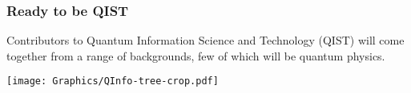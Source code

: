 
\begin{frame}
  \frametitle{Ready to be QIST}
  {\footnotesize %
    Contributors to Quantum Information Science and Technology (QIST) will
    come together from a range of backgrounds, few of which will be quantum
    physics. %
  }

  \mbox{}\hfill%
  \texttt{[image: Graphics/QInfo-tree-crop.pdf]} %
  \hfill\mbox{}
\end{frame}

